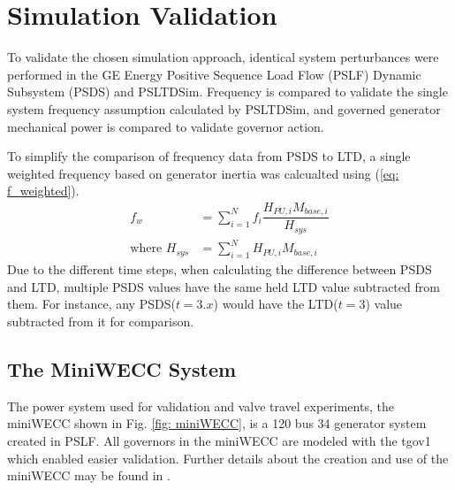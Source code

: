 \section{Simulation Validation}
To validate the chosen simulation approach, identical system perturbances were performed in the GE Energy Positive Sequence Load Flow (PSLF) Dynamic Subsystem (PSDS) and PSLTDSim.
Frequency is compared to validate the single system frequency assumption calculated by PSLTDSim, and governed generator mechanical power is compared to validate governor action.

To simplify the comparison of frequency data from PSDS to LTD, a single weighted frequency based on generator inertia was calcualted using (\ref{eq: f_weighted}).
\begin{align}
f_{w} &= \sum_{i=1}^{N} f_i \dfrac{H_{PU, i} M_{base, i} }{H_{sys}}  \label{eq: f_weighted}\\
\text{where } H_{sys} &= \sum_{i=1}^{N} H_{PU, i} M_{base, i}  \label{eq: Hsys}
\end{align}%
Due to the different time steps, when calculating the difference between PSDS and LTD, multiple PSDS values have the same held LTD value subtracted from them. 
For instance, any PSDS($t = 3.x$) would have the LTD($t = 3$) value subtracted from it for comparison.

\subsection{The MiniWECC System}

The power system used for validation and valve travel experiments, the miniWECC shown in Fig. \ref{fig: miniWECC}, is a 120 bus 34 generator system created in PSLF.
All governors in the miniWECC are modeled with the tgov1 which enabled easier validation.
Further details about the creation and use of the miniWECC may be found in \cite{trudnowski2012, sandia2015, RJminiWECC}.

